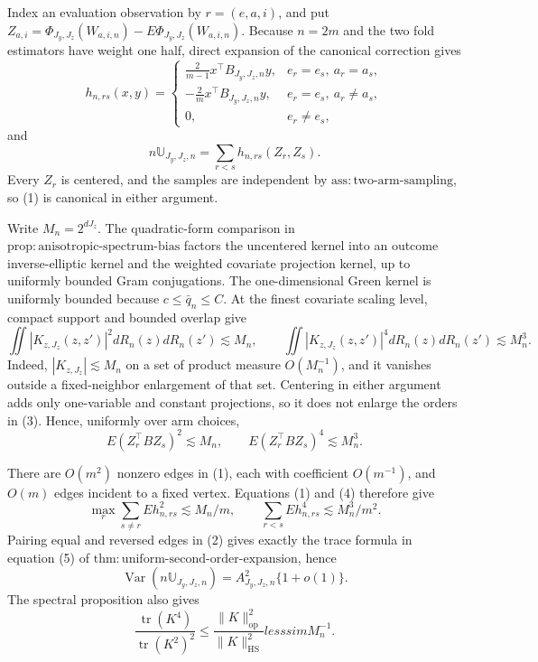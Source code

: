 Index an evaluation observation by \(r=(e,a,i)\), and put \(Z_{a,i}=\Phi_{J_y,J_z}(W_{a,i,n})-E\Phi_{J_y,J_z}(W_{a,i,n})\). Because \(n=2m\) and the two fold estimators have weight one half, direct expansion of the canonical correction gives
\[
h_{n,rs}(x,y)=
\begin{cases}
\displaystyle\frac{2}{m-1}x^\top B_{J_y,J_z,n}y,
&e_r=e_s,\ a_r=a_s,\\[6pt]
\displaystyle-\frac{2}{m}x^\top B_{J_y,J_z,n}y,
&e_r=e_s,\ a_r\ne a_s,\\[6pt]
0,&e_r\ne e_s,
\end{cases}                                                       \tag{1}
\]
and
\[
n\mathbb U_{J_y,J_z,n}=\sum_{r<s}h_{n,rs}(Z_r,Z_s).              \tag{2}
\]
Every \(Z_r\) is centered, and the samples are independent by \(\mathrm{ass{:}two\text{-}arm\text{-}sampling}\), so (1) is canonical in either argument.

Write \(M_n=2^{dJ_z}\). The quadratic-form comparison in \(\mathrm{prop{:}anisotropic\text{-}spectrum\text{-}bias}\) factors the uncentered kernel into an outcome inverse-elliptic kernel and the weighted covariate projection kernel, up to uniformly bounded Gram conjugations. The one-dimensional Green kernel is uniformly bounded because \(c\le\bar q_n\le C\). At the finest covariate scaling level, compact support and bounded overlap give
\[
\iint |K_{z,J_z}(z,z')|^2dR_n(z)dR_n(z')\lesssim M_n,
\qquad
\iint |K_{z,J_z}(z,z')|^4dR_n(z)dR_n(z')\lesssim M_n^3.          \tag{3}
\]
Indeed, \(|K_{z,J_z}|\lesssim M_n\) on a set of product measure \(O(M_n^{-1})\), and it vanishes outside a fixed-neighbor enlargement of that set. Centering in either argument adds only one-variable and constant projections, so it does not enlarge the orders in (3). Hence, uniformly over arm choices,
\[
E(Z_r^\top BZ_s)^2\lesssim M_n,
\qquad
E(Z_r^\top BZ_s)^4\lesssim M_n^3.                                \tag{4}
\]

There are \(O(m^2)\) nonzero edges in (1), each with coefficient \(O(m^{-1})\), and \(O(m)\) edges incident to a fixed vertex. Equations (1) and (4) therefore give
\[
\max_r\sum_{s\ne r}Eh_{n,rs}^2\lesssim M_n/m,
\qquad
\sum_{r<s}Eh_{n,rs}^4\lesssim M_n^3/m^2.                         \tag{5}
\]
Pairing equal and reversed edges in (2) gives exactly the trace formula in equation (5) of \(\mathrm{thm{:}uniform\text{-}second\text{-}order\text{-}expansion}\), hence
\[
\operatorname{Var}(n\mathbb U_{J_y,J_z,n})=A_{J_y,J_z,n}^2\{1+o(1)\}. \tag{6}
\]
The spectral proposition also gives
\[
\frac{\operatorname{tr}(K^4)}{\operatorname{tr}(K^2)^2}
\le\frac{\|K\|_{\mathrm{op}}^2}{\|K\|_{\mathrm{HS}}^2}lesssim M_n^{-1}. \tag{7}
\]

